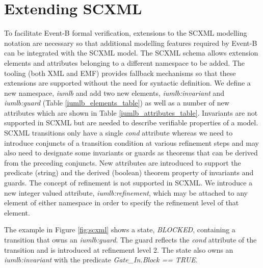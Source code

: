 
\section{Extending SCXML}
\label{sect:extension}


To facilitate Event-B formal verification, extensions to the SCXML 
modelling notation are necessary so that additional modelling features 
required by Event-B can be integrated with the SCXML model.
The SCXML schema allows extension elements and attributes belonging 
to a different namespace to be added. The tooling (both XML and EMF) 
provides fallback mechanisms so that these extensions are supported 
without the need for syntactic definition. We define a new namespace,  
\emph{iumlb} and add two new elements, \emph{iumlb:invariant} and 
\emph{iumlb:guard} (Table \ref{iumlb_elements_table}) as well as a 
number of new attributes which are shown in Table \ref{iumlb_attributes_table}.
Invariants are not supported in SCXML but are needed to describe 
verifiable properties of a model. SCXML transitions only have a single 
\emph{cond} attribute whereas we need to introduce conjuncts of a transition
condition at various refinement steps and may also need to designate some 
invariants or guards as theorems that can be derived from the preceding conjuncts. 
New attributes are introduced to support the predicate (string) and the 
derived (boolean) theorem property of invariants and guards. The concept 
of refinement is not supported in SCXML. We introduce a new integer valued 
attribute, \emph{iumlb:refinement}, which may be attached to any element of 
either namespace in order to specify the refinement level of that element. 


 The example in Figure \ref{fig:scxml} shows a state, \emph{BLOCKED}, containing a transition that owns an \emph{iumlb:guard}.
  The guard reflects the \emph{cond} attribute of the transition and is introduced at refinement level 2. 
The state also owns an \emph{iumlb:invariant} with the predicate \emph{Gate\_In.Block == TRUE}.



